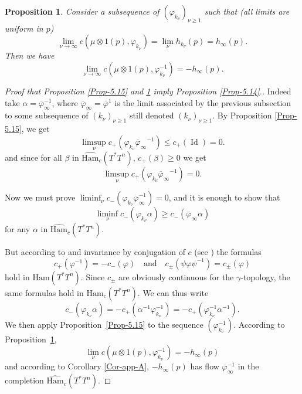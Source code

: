 \documentclass[JEP,XML,SOM,NoFloatCountersInSection,Unicode,published]{cedram}
\newcommand{\quand}{\quad\text{and}\quad}
\numberwithin{equation}{section}
\DeclareMathOperator{\Id}{Id}
\newcommand {\DHam}{\mathrm{Ham}}
\newcommand{\gclDHamc}[1]{\widehat{\DHam}_c(#1)}
\let \varpsi \varphi
\theoremstyle{plain}
\newtheorem{proposition}[theorem]{Proposition}
\theoremstyle{definition}
\theoremstyle{remark}
\begin{document}
\begin{proposition}\label{Prop-5.16}
Consider a subsequence of $(\varphi_{k_{\nu}})_{\nu\geq 1}$ such that (all limits are uniform in $p$)
\[
\lim_{\nu \to \infty} c (\mu \otimes 1 (p), \varphi_{k_{\nu}}^{}) =\lim_{\nu} {h}_{k_{\nu}} (p)
= {h}_{\infty} (p).
\]
Then we have
\[
\lim_{\nu \to \infty} c (\mu \otimes 1 (p), \varphi^{-1}_{k_{\nu}}) = - {h}_{\infty}
(p).
\]
\end{proposition}
\begin{proof} [ Proof that Proposition \ref{Prop-5.15} and \ref{Prop-5.16} imply
Proposition \ref{Prop-5.14}.]

Indeed take $\alpha = \overline\varpsi_\infty ^{-1}$, where $\overline \varpsi_\infty=\overline\varphi^{1}$ is the limit associated by the previous subsection to some subsequence of $(k_{\nu})_{\nu \geq 1}$ still denoted $(k_{\nu})_{\nu \geq 1}$. By Proposition \ref{Prop-5.15}, we get
\[
\limsup_{\nu} c_+(\varphi_{k_{\nu}} {\overline\varpsi_\infty}^{-1}) \leq c_+(\Id)= 0.
\]
and since for all $\beta$ in $\gclDHamc{T^*T^n}$, $c_+(\beta) \geq 0$ we get
\[
\limsup_{\nu} c _+(\varphi_{k_{\nu}} {\overline\varpsi_\infty}^{-1})=0.
\]

Now we must prove $\liminf_{\nu} c _-(\varphi_{ k_{\nu}} \overline\varpsi_\infty^{-1}) =0$, and it is enough to show that
\[
\liminf_{\nu} c_-(\varphi_{k_{\nu}}\alpha) \geq c_-(\overline\varphi_\infty \alpha)
\]
for any $\alpha$ in $\gclDHamc{T^{*}T^{n}}$.

But according to
\cite[Prop.\,4.2(2), p.\,697]{Viterbo-STAGGF} and invariance by conjugation of $c$ (see \cite{Viterbo-STAGGF}) the formulas
\[
c_+(\varphi^{-1})=-c_-(\varphi)\quand
c_\pm (\psi\varphi\psi^{-1})=c_\pm(\varphi)
\]
hold in $\DHam(T^*T^n)$. Since $c_\pm$ are obviously continuous for the $\gamma$-topology, the same formulas hold in $\gclDHamc{T^*T^n}$.
We can thus write
\[
c_-(\varphi_{ k_{\nu}}\alpha) =
- c_+(\alpha^{-1}\varphi_{k_{\nu}}^{-1})
= - c_+(\varphi^{-1}_{k_{\nu}} \alpha^{-1}).
\]
We then apply Proposition~\ref{Prop-5.15} to the sequence
$(\varphi^{-1}_{k_{\nu}})$. According to Proposition~\ref{Prop-5.16},
\[
\lim_{\nu} c (\mu \otimes 1 (p), \varphi^{-1}_{k_{\nu}}) = - {h}_{\infty}(p)
\]
and according to Corollary \ref{Cor-app-A}, $-{ h}_{\infty}(p)$ has flow $\overline\varphi_\infty^{-1}$ in the completion
$\gclDHamc{T^*T^n}$.


\end{proof}
\end{document}
